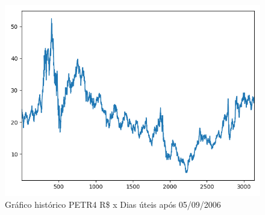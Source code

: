 \documentclass[
	article,			%
	11pt,				%
	oneside,			%
	a4paper,			%
	english,			%
	brazil,				%
	sumario=tradicional
	]{abntex2}
\begin{document}
\begin{anexosenv}

\begin{figure}[htb]
	\caption{\label{petr4-chart}Gráfico histórico PETR4 R\$ x Dias úteis após 05/09/2006}
	\begin{center}
		\includegraphics[scale=0.5]{images/petr4_chart.png}
	\end{center}
\end{figure}


\end{anexosenv}
\end{document}

